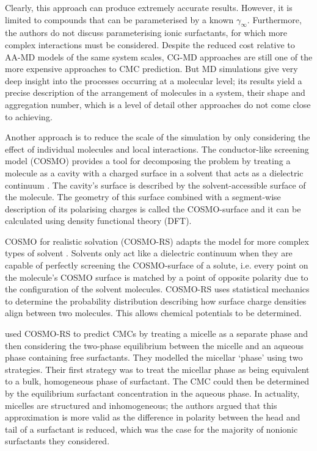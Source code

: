Clearly, this approach can produce extremely accurate results. However, it is
limited to compounds that can be parameterised by a known $\gamma_\infty$.
Furthermore, the authors do not discuss parameterising ionic surfactants, for
which more complex interactions must be considered. Despite the reduced cost
relative to AA-MD models of the same system scales, CG-MD approaches are still
one of the more expensive approaches to CMC prediction. But MD simulations give
very deep insight into the processes occurring at a molecular level; its results
yield a precise description of the arrangement of molecules in a system, their
shape and aggregation number, which is a level of detail other approaches do not
come close to achieving.

Another approach is to reduce the scale of the simulation by only considering
the effect of individual molecules and local interactions. The conductor-like
screening model (COSMO) provides a tool for decomposing the problem by treating
a molecule as a cavity with a charged surface in a solvent that acts as a
dielectric continuum \cite{klamtCOSMONewApproach1993}. The cavity's surface is
described by the solvent-accessible surface of the molecule. The geometry of
this surface combined with a segment-wise description of its polarising charges
is called the COSMO-surface and it can be calculated using density functional
theory (DFT).

COSMO for realistic solvation (COSMO-RS) adapts the model for more complex types
of solvent \cite{klamtCOSMORSAlternativeSimulation2010}. Solvents only act like
a dielectric continuum when they are capable of perfectly screening the
COSMO-surface of a solute, i.e. every point on the molecule's COSMO surface is
matched by a point of opposite polarity due to the configuration of the solvent
molecules. COSMO-RS uses statistical mechanics to determine the probability
distribution describing how surface charge densities align between two
molecules. This allows chemical potentials to be determined.

\citet{turchiFirstprinciplesPredictionCritical2022} used COSMO-RS to predict
CMCs by treating a micelle as a separate phase and then considering the
two-phase equilibrium between the micelle and an aqueous phase containing free
surfactants. They modelled the micellar `phase' using two strategies. Their
first strategy was to treat the micellar phase as being equivalent to a bulk,
homogeneous phase of surfactant. The CMC could then be determined by the
equilibrium surfactant concentration in the aqueous phase. In actuality,
micelles are structured and inhomogeneous; the authors argued that this
approximation is more valid as the difference in polarity between the head and
tail of a surfactant is reduced, which was the case for the majority of nonionic
surfactants they considered.


